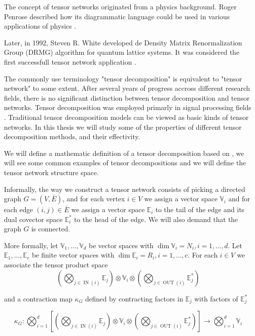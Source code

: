 \documentclass[11pt,a4paper,openright,oneside]{book}
\numberwithin{equation}{section}
\DeclareMathOperator{\IN}{IN}
\DeclareMathOperator{\OUT}{OUT}
\begin{document}
The concept of tensor networks originated from a physics background. Roger Penrose described how its
diagrammatic language could be used in various applications of physics \cite{rogerPenroseApplications}.

Later, in 1992, Steven R. White developed de Density Matrix Renormalization Group (DRMG) algorithm for
quantum lattice systems. It was considered the first successfull tensor network application \cite{whiteDensityMatrixFormulation1992}.

The commonly use terminology "tensor decomposition" is equivalent to "tensor network" to some extent. After
several years of progress accross different research fields, there is no significant distinction between tensor decomposition
and tensor networks. Tensor decomposition was employed primarly in signal processing fields \cite{wangTensorNetworksMeet2023}. Traditional
tensor decomposition models can be viewed
as basic kinds of tensor networks. In this thesis we will study some of the properties of different tensor decomposition methods,
and their effectivity.

We will define a mathematic definition of a tensor decomposition based on \cite{yeTensorNetworkRanks2019}, we will
see some common examples of tensor decompositions and we will define the 
tensor network structure space.

Informally, the way we construct a tensor network consists of picking a directed graph $G = (V, \bar{E})$, and for each vertex $i \in V$ we assign
a vector space $\mathbb{V}_i$ and for each edge $(i,j) \in \bar{E}$ we assign a vector space $\mathbb{E}_i$ to the tail of the edge and its 
dual covector space $\mathbb{E}_i^*$ to the head of the edge. We will also demand that the graph $G$ is connected.

More formally, let $\mathbb{V}_1, \dots, \mathbb{V}_d$ be vector spaces with $\dim{\mathbb{V}_i} = N_i, i = 1, \dots, d$. Let
$\mathbb{E}_1, \dots, \mathbb{E}_c$ be finite vector spaces with $\dim{\mathbb{E}_i} = R_i, i = 1, \dots, c$. For each $i \in V$ we associate
the tensor product space
$$\left( \bigotimes\nolimits_{j \in \IN (i)} \mathbb{E}_j \right) \otimes \mathbb{V}_i \otimes 
\left( \bigotimes\nolimits_{j \in \OUT (i)} \mathbb{E}_j^*  \right)$$

and a contraction map $\kappa_G$ defined by contracting factors in $\mathbb{E}_j$ with factors of $\mathbb{E}^*_j$

$$\kappa_G : \bigotimes\nolimits_{i=1}^d \left[ \left( \bigotimes\nolimits_{j \in \IN (i)} \mathbb{E}_j \right) \otimes \mathbb{V}_i \otimes 
\left( \bigotimes\nolimits_{j \in \OUT (i)} \mathbb{E}_j^*  \right)  \right] \rightarrow \bigotimes\nolimits_{i=1}^d \mathbb{V}_i$$
\end{document}
